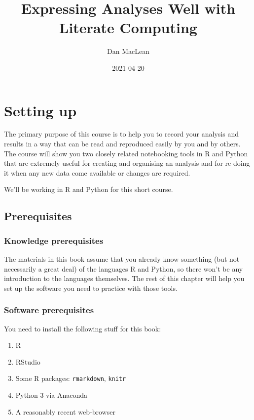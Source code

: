 \documentclass[
]{book}
\title{Expressing Analyses Well with Literate Computing}
\author{Dan MacLean}
\date{2021-04-20}
\providecommand{\tightlist}{%
  \setlength{\itemsep}{0pt}\setlength{\parskip}{0pt}}
\begin{document}
\maketitle

{
\setcounter{tocdepth}{1}
\tableofcontents
}
\hypertarget{setting-up}{%
\chapter{Setting up}\label{setting-up}}

The primary purpose of this course is to help you to record your analysis and results in a way that can be read and reproduced easily by you and by others. The course will show you two closely related notebooking tools in R and Python that are extremely useful for creating and organising an analysis and for re-doing it when any new data come available or changes are required.

We'll be working in R and Python for this short course.

\hypertarget{prerequisites}{%
\section{Prerequisites}\label{prerequisites}}

\hypertarget{knowledge-prerequisites}{%
\subsection{Knowledge prerequisites}\label{knowledge-prerequisites}}

The materials in this book assume that you already know something (but not necessarily a great deal) of the languages R and Python, so there won't be any introduction to the languages themselves. The rest of this chapter will help you set up the software you need to practice with those tools.

\hypertarget{software-prerequisites}{%
\subsection{Software prerequisites}\label{software-prerequisites}}

You need to install the following stuff for this book:

\begin{enumerate}
\def\labelenumi{\arabic{enumi}.}
\tightlist
\item
  R
\item
  RStudio
\item
  Some R packages: \texttt{rmarkdown}, \texttt{knitr}
\item
  Python 3 via Anaconda
\item
  A reasonably recent web-browser
\end{enumerate}
\end{document}
